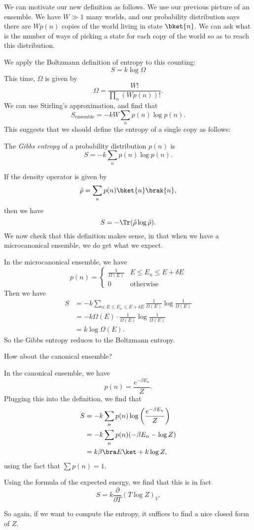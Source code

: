 \documentclass[a4paper]{article}
\begin{document}
We can motivate our new definition as follows. We use our previous picture of an ensemble. We have $W \gg 1$ many worlds, and our probability distribution says there are $W p(n)$ copies of the world living in state $\bket{n}$. We can ask what is the number of ways of picking a state for each copy of the world so as to reach this distribution.

We apply the Boltzmann definition of entropy to this counting:
\[
  S = k \log \Omega
\]
This time, $\Omega$ is given by
\[
  \Omega = \frac{W!}{\prod_n (W p(n))!}.
\]
We can use Stirling's approximation, and find that
\[
  S_{\mathrm{ensemble}} = -kW \sum_n p(n) \log p(n).
\]
This suggests that we should define the entropy of a single copy as follows:
\begin{defi}
  The \emph{Gibbs entropy} of a probability distribution $p(n)$ is
  \[
    S = -k \sum_n p(n) \log p(n).
  \]
\end{defi}
If the density operator is given by
\[
  \hat{\rho} = \sum_n p(n) \bket{n}\brak{n},
\]
then we have
\[
  S = - \Tr(\hat{\rho} \log \hat{\rho}).
\]
We now check that this definition makes sense, in that when we have a microcanonical ensemble, we do get what we expect.
\begin{eg}
  In the microcanonical ensemble, we have
  \[
    p(n) =
    \begin{cases}
      \frac{1}{\Omega(E)} & E \leq E_n \leq E + \delta E\\
      0 & \text{otherwise}
    \end{cases}
  \]
  Then we have
  \begin{align*}
    S &= -k \sum_{n: E \leq E_n \leq E + \delta E} \frac{1}{\Omega(E)} \log \frac{1}{\Omega(E)} \\
    &= -k \Omega(E) \cdot \frac{1}{\Omega(E)} \log \frac{1}{\Omega(E)} \\
    &= k \log \Omega(E).
  \end{align*}
  So the Gibbs entropy reduces to the Boltzmann entropy.
\end{eg}

How about the canonical ensemble?
\begin{eg}
  In the canonical ensemble, we have
  \[
    p(n) = \frac{e^{-\beta E_n}}{Z}.
  \]
  Plugging this into the definition, we find that
  \begin{align*}
    S &= -k \sum_n p(n) \log \left(\frac{e^{-\beta E_n}}{Z}\right)\\
    &= -k \sum_n p(n) (-\beta E_n - \log Z)\\
    &= k \beta \bra E\ket + k\log Z,
  \end{align*}
  using the fact that $\sum p(n) = 1$.

  Using the formula of the expected energy, we find that this is in fact
  \[
    S = k \frac{\partial}{\partial T} (T \log Z)_V.
  \]
\end{eg}
So again, if we want to compute the entropy, it suffices to find a nice closed form of $Z$.
\end{document}
